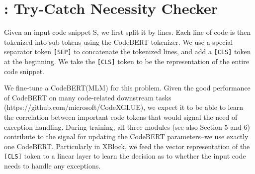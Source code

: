\section{{\xblock}: Try-Catch Necessity Checker}
\label{detect:sec}

Given an input code snippet S, we first split it by lines. Each line of code is then tokenized into sub-tokens using the CodeBERT tokenizer. We use a special separator token \texttt{[SEP]} to concatenate the tokenized lines, and add a \texttt{[CLS]} token at the beginning. We take the \texttt{[CLS]} token to be the representation of the entire code snippet.

We fine-tune a CodeBERT(MLM) for this problem. Given the good performance of CodeBERT on many code-related downstream tasks (https://github.com/microsoft/CodeXGLUE), we expect it to be able to learn the correlation between important code tokens that would signal the need of exception handling. During training, all three modules (see also Section 5 and 6) contribute to the signal for updating the CodeBERT parameters–we use exactly one CodeBERT. Particularly in XBlock, we feed the vector representation of the \texttt{[CLS]} token to a linear layer to learn the decision as to whether the input code needs to handle any exceptions. 






